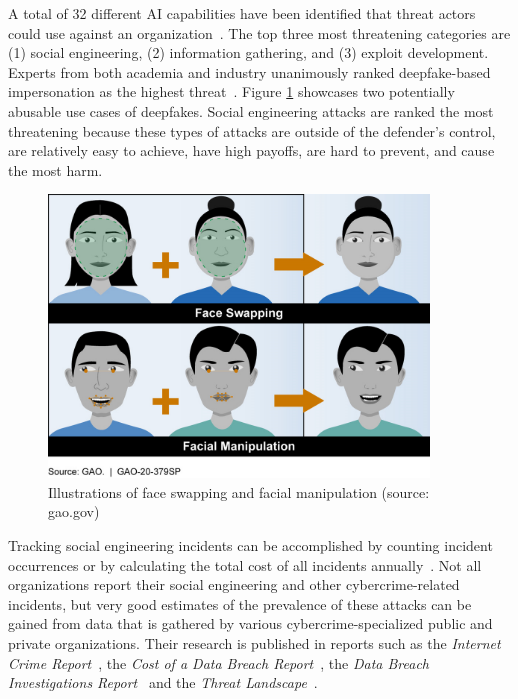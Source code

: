 %
%
A total of 32 different AI capabilities have been identified that threat actors could use against an organization~\citep{mirsky_Threat_Offensive_AI_Organizations_2023}. The top three most threatening categories are (1) social engineering, (2) information gathering, and (3) exploit development. Experts from both academia and industry unanimously ranked deepfake-based impersonation as the highest threat~\citep{mirsky_Threat_Offensive_AI_Organizations_2023}. Figure \ref{figure:deepfakes} showcases two potentially abusable use cases of deepfakes. Social engineering attacks are ranked the most threatening because these types of attacks are outside of the defender's control, are relatively easy to achieve, have high payoffs, are hard to prevent, and cause the most harm.

\begin{figure}[ht]  
    \centering  
    \includegraphics[width=0.9\textwidth]{images/704754.png}  
    \caption{Illustrations of face swapping and facial manipulation (source: gao.gov)}  
    \label{figure:deepfakes}  
\end{figure}  

%
%
Tracking social engineering incidents can be accomplished by counting incident occurrences or by calculating the total cost of all incidents annually~\citep{ibm_Cost_Data_Breach_Report_2024}. Not all organizations report their social engineering and other cybercrime-related incidents, but very good estimates of the prevalence of these attacks can be gained from data that is gathered by various cybercrime-specialized public and private organizations. Their research is published in reports such as the \textit{Internet Crime Report}~\citep{fbi_Internet_Crime_Report_2023}, the \textit{Cost of a Data Breach Report}~\citep{ibm_Cost_Data_Breach_Report_2024}, the \textit{Data Breach Investigations Report}~\citep{verizon_Data_Breach_Investigations_Report_2024} and the \textit{Threat Landscape}~\citep{eniza_Threat_Landscape_2024}. 




